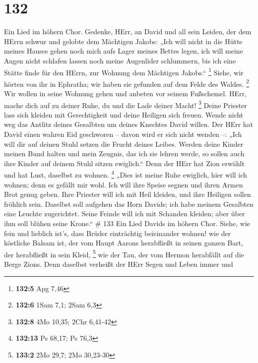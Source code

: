 \hypertarget{section-42}{%
\section{132}\label{section-42}}

 Ein Lied im höhern Chor. Gedenke, HErr, an David und all
sein Leiden,  der dem HErrn schwur und gelobte dem Mächtigen
Jakobs:  „Ich will nicht in die Hütte meines Hauses gehen
noch mich aufs Lager meines Bettes legen,  ich will meine
Augen nicht schlafen lassen noch meine Augenlider schlummern,
 bis ich eine Stätte finde für den HErrn, zur Wohnung dem
Mächtigen Jakobs.`` \footnote{\textbf{132:5} Apg 7,46} 
Siehe, wir hörten von ihr in Ephratha; wir haben sie gefunden auf dem
Felde des Waldes. \footnote{\textbf{132:6} 1Sam 7,1; 2Sam 6,3}
 Wir wollen in seine Wohnung gehen und anbeten vor seinem
Fußschemel.  HErr, mache dich auf zu deiner Ruhe, du und die
Lade deiner Macht! \footnote{\textbf{132:8} 4Mo 10,35; 2Chr 6,41-42}
 Deine Priester lass sich kleiden mit Gerechtigkeit und
deine Heiligen sich freuen.  Wende nicht weg das Antlitz
deines Gesalbten um deines Knechtes David willen.  Der HErr
hat David einen wahren Eid geschworen -- davon wird er sich nicht wenden
--: „Ich will dir auf deinen Stuhl setzen die Frucht deines Leibes.
 Werden deine Kinder meinen Bund halten und mein Zeugnis,
das ich sie lehren werde, so sollen auch ihre Kinder auf deinem Stuhl
sitzen ewiglich.``  Denn der HErr hat Zion erwählt und hat
Lust, daselbst zu wohnen. \footnote{\textbf{132:13} Ps 68,17; Ps 76,3}
 „Dies ist meine Ruhe ewiglich, hier will ich wohnen; denn
es gefällt mir wohl.  Ich will ihre Speise segnen und ihren
Armen Brot genug geben.  Ihre Priester will ich mit Heil
kleiden, und ihre Heiligen sollen fröhlich sein.  Daselbst
soll aufgehen das Horn Davids; ich habe meinem Gesalbten eine Leuchte
zugerichtet.  Seine Feinde will ich mit Schanden kleiden;
aber über ihm soll blühen seine Krone.`` \# 133  Ein Lied
Davids im höhern Chor. Siehe, wie fein und lieblich ist's, dass Brüder
einträchtig beieinander wohnen!  wie der köstliche Balsam
ist, der vom Haupt Aarons herabfließt in seinen ganzen Bart, der
herabfließt in sein Kleid, \footnote{\textbf{133:2} 2Mo 29,7; 2Mo
  30,23-30}  wie der Tau, der vom Hermon herabfällt auf die
Berge Zions. Denn daselbst verheißt der HErr Segen und Leben immer und
